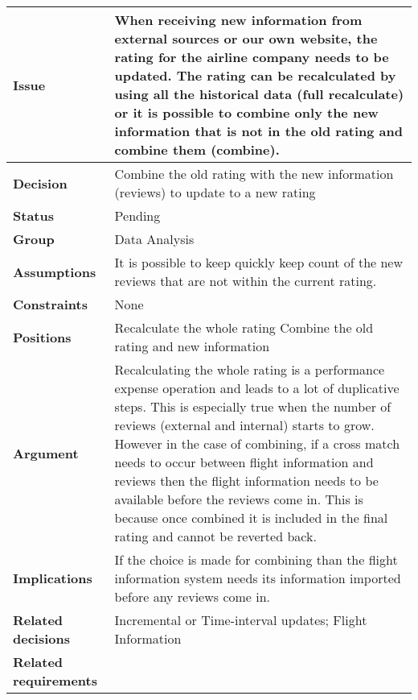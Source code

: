 
\begin{tabular}{ l  p{10cm}}
\hline
\bf Issue & When receiving new information from external sources or our own website, the rating for the airline company needs to be updated. The rating can be recalculated by using all the historical data (full recalculate) or it is possible to combine only the new information that is not in the old rating and combine them (combine). \\
\hline
\bf Decision & Combine the old rating with the new information (reviews) to update to a new rating\\
\hline
\bf Status & Pending\\
\hline
\bf Group & Data Analysis \\
\hline
\bf Assumptions & It is possible to keep quickly keep count of the new reviews that are not within the current rating. \\
\hline
\bf Constraints & None\\
\hline
\bf Positions & Recalculate the whole rating \newline\newline
Combine the old rating and new information
\\
\hline
\bf Argument & Recalculating the whole rating is a performance expense operation and leads to a lot of duplicative steps. This is especially true when the number of reviews (external and internal) starts to grow. However in the case of combining, if a cross match needs to occur between flight information and reviews then the flight information needs to be available before the reviews come in. This is because once combined it is included in the final rating and cannot be reverted back. \\
\hline
\bf Implications & If the choice is made for combining than the flight information system needs its information imported before any reviews come in. \\
\hline
\bf Related decisions & Incremental or Time-interval updates; Flight Information \\
\hline
\bf Related requirements  & \\
\hline
\end{tabular}
